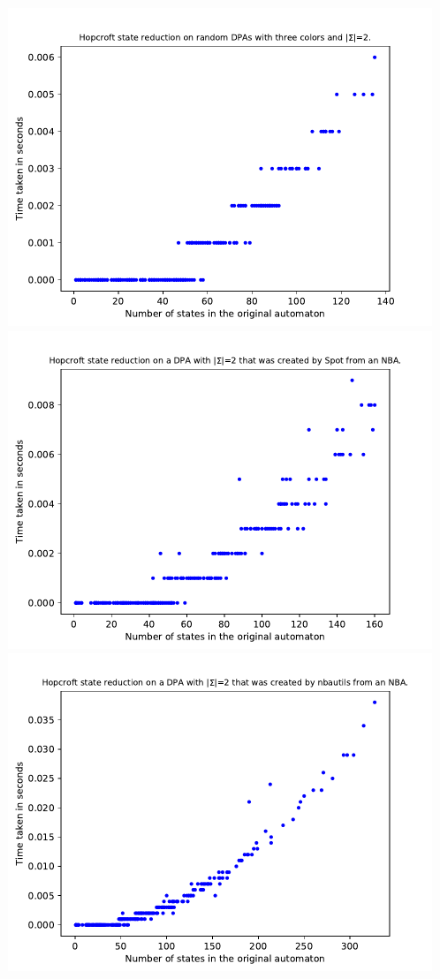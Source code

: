 \begin{figure}
	\centering
	\begin{minipage}{0.49\textwidth}
		\includegraphics[page=6,height=.3\textheight]{../data/analysis/hopcroft/gendet_ap1.pdf} 
		\includegraphics[page=6,height=.3\textheight]{../data/analysis/hopcroft/detspot_ap1.pdf} 
		\includegraphics[page=6,height=.3\textheight]{../data/analysis/hopcroft/detnbaut_ap1.pdf} 

\end{minipage}
\end{figure}
